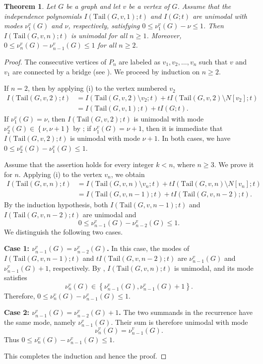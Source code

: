 \documentclass[12pt,twoside]{amsart}
\newtheorem{theorem}[thm]{Theorem}
\theoremstyle{definition}
\theoremstyle{mystyle}
\newcommand{\brb}[1]{\left\{#1\right\}}
\newcommand{\tail}[1]{\mathrm{Tail}(#1)}
\begin{document}
\begin{theorem}\label{unimodal_tail}
Let $G$ be a graph and let $v$ be a vertex of $G$. Assume that the independence polynomials $I(\tail{G,v,1};t)$ and $I(G;t)$ are unimodal with modes $\nu_1^v(G)$ and $\nu$, respectively, satisfying $0\le \nu_1^v(G)- \nu \leq 1$. Then $I(\tail{G,v,n};t)$ is unimodal for all $n\geq 1$. Moreover, $0\le \nu_n^v(G)- \nu_{n-1}^v(G)\leq 1$ for all $n\geq 2$. 
\end{theorem}
\begin{proof}
The consecutive vertices of $P_n$ are labeled as $v_1,v_2,\ldots,v_n$ such that $v$ and $v_1$ are connected by a bridge (see ).  We proceed by induction on $n\ge 2$.
 
If $n=2$, then by applying (i) to the vertex numbered $v_2$
\begin{align*}
 I(\tail{G,v,2};t) &= I(\tail{G,v,2}\setminus v_2;t)+ tI(\tail{G,v,2}\setminus N[v_2];t)\\
  &= I(\tail{G,v,1};t) + tI(G;t).
 \end{align*}
If $\nu_1^v(G)= \nu$, then $I(\tail{G,v,2};t)$ is unimodal with mode $\nu_2^v(G)\in \brb{\nu,\nu+1}$ by ; if $\nu_1^v(G)=\nu+1$, then it is immediate that $I(\tail{G,v,2};t)$ is unimodal with mode $\nu+1$. In both cases, we have $0\leq \nu_2^v(G)- \nu_1^v(G)\leq 1$. 

Assume that the assertion holds for every integer $k<n$, where $n\geq3$.
We prove it for $n$. Applying (i) to the
vertex $v_n$, we obtain
\begin{align*}
I(\tail{G,v,n};t)
&=
I(\tail{G,v,n}\setminus v_n;t) +tI(\tail{G,v,n}\setminus N[v_n];t) \\
&=
I(\tail{G,v,n-1};t)
+tI(\tail{G,v,n-2};t).
\end{align*}
By the induction hypothesis, both
$I(\tail{G,v,n-1};t)$ and
$I(\tail{G,v,n-2};t)$ are unimodal and
\[
0\leq
\nu_{n-1}^v(G)-\nu_{n-2}^v(G)
\leq1.
\]
We distinguish the following two cases.

\noindent \textbf{Case 1: $\nu_{n-1}^v(G)=\nu_{n-2}^v(G)$.} In this case, the modes of
	$I(\tail{G,v,n-1};t)$ and
	$tI(\tail{G,v,n-2};t)$ are
	$\nu_{n-1}^v(G)$ and $\nu_{n-1}^v(G)+1$, respectively.
	By ,
	$I(\tail{G,v,n};t)$ is unimodal, and its mode satisfies
	\[
	\nu_n^v(G)\in
	\brb{\nu_{n-1}^v(G),\nu_{n-1}^v(G)+1}.
	\]
	Therefore,
	$0\leq \nu_n^v(G)-\nu_{n-1}^v(G)\leq 1$.

\noindent
\textbf{Case 2: $\nu_{n-1}^v(G)=\nu_{n-2}^v(G)+1$.}
The two summands in the recurrence have the same mode,
namely $\nu_{n-1}^v(G)$. Their sum is therefore unimodal
with mode
\[
\nu_n^v(G)=\nu_{n-1}^v(G).
\]
Thus $0\leq\nu_n^v(G)-\nu_{n-1}^v(G)\leq1$.


This completes the induction and hence the proof.
\end{proof}
\end{document}
